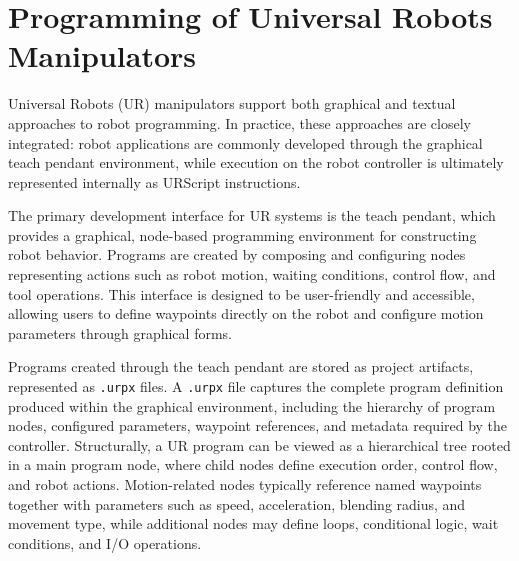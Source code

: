 



\section{Programming of Universal Robots Manipulators}
Universal Robots (UR) manipulators support both graphical and textual approaches to robot programming. In practice, these approaches are closely integrated: robot applications are commonly developed through the graphical teach pendant environment, while execution on the robot controller is ultimately represented internally as URScript instructions. \cite{MartinRytterFiveWaysToProgramACobot}

The primary development interface for UR systems is the teach pendant, which provides a graphical, node-based programming environment for constructing robot behavior. Programs are created by composing and configuring nodes representing actions such as robot motion, waiting conditions, control flow, and tool operations. This interface is designed to be user-friendly and accessible, allowing users to define waypoints directly on the robot and configure motion parameters through graphical forms.

Programs created through the teach pendant are stored as project artifacts, represented as \texttt{.urpx} files. A \texttt{.urpx} file captures the complete program definition produced within the graphical environment, including the hierarchy of program nodes, configured parameters, waypoint references, and metadata required by the controller. Structurally, a UR program can be viewed as a hierarchical tree rooted in a main program node, where child nodes define execution order, control flow, and robot actions. Motion-related nodes typically reference named waypoints together with parameters such as speed, acceleration, blending radius, and movement type, while additional nodes may define loops, conditional logic, wait conditions, and I/O operations.

